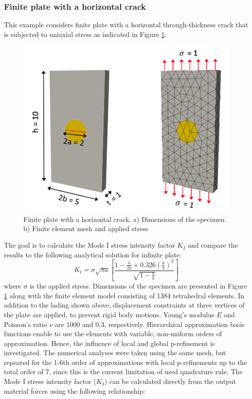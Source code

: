 \documentclass[11pt]{ACMEarticle}
\numberwithin{equation}{section}
\begin{document}
\subsubsection{Finite plate with a horizontal crack}\label{sec:plate_section}
This example considers finite plate with a horizontal through-thickness crack that is subjected to uniaxial stress as indicated in Figure \ref{fig:plate_load_mesh}. 
\begin{figure}
	\centering
	\includegraphics[width=0.5\linewidth]{Figures/plate_load_mesh}
	\caption{Finite plate with a horizontal crack. a) Dimensions of the specimen. b) Finite element mesh and applied stress}
	\label{fig:plate_load_mesh}
\end{figure}
The goal is to calculate the Mode I stress intensity factor $ K_I $ and compare the results to the following analytical solution \citep{rooke1976compendium} for infinite plate:
\begin{equation}\label{eq:frac_analytical}
K_t=\sigma \sqrt{\pi a} \left[  \frac{1 - \frac{a}{2b} + 0.326 (\frac{a}{b})^2 }{\sqrt{1-\frac{a}{b}}}  \right]
\end{equation}
where $\sigma $ is the applied stress. Dimensions of the specimen are presented in Figure \ref{fig:plate_load_mesh} along with the finite element model consisting of 1384 tetrahedral elements. In addition to the lading shown above, displacement constraints at three vertices of the plate are applied, to prevent rigid body motions. Young's modulus $E$ and Poisson's ratio $\nu$ are $1000$ and $0.3$, respectively. 
Hierarchical approximation basis functions enable to use the elements with variable, non-uniform orders of approximation. Hence, the influence of local and global p-refinement is investigated. The numerical analyses were taken using the same mesh, but repeated for the 1-6th order of approximations with local p-refinements up to the total order of 7, since this is the current limitation of used quadrature rule. The Mode I stress intensity factor ($K_I$) can be calculated directly from the output material forces using the following relationship: 
\end{document}
